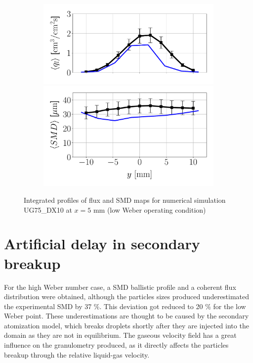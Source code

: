 \begin{figure}[ht]
\begin{subfigure}[b]{0.4\textwidth}
	\flushleft
   \includegraphics[scale=0.35]{./part2_developments/figures_ch6_lagrangian_JICF/params_OP/profiles/flux_along_y}\\
   \vspace{-0.16in}
   \includegraphics[scale=0.35]{./part2_developments/figures_ch6_lagrangian_JICF/params_OP/profiles/SMD_along_y}
\end{subfigure}
\vspace*{-0.2in}
\caption{Integrated profiles of flux and SMD maps for numerical simulation UG75\_DX10 at $x = 5$ mm (low Weber operating condition)}
\label{fig:profiles_LGS_JICF_OP}
\end{figure}


\section{Artificial delay in secondary breakup}
\label{sec:LGS_delay_secon_atom}

For the high Weber number case, a SMD ballistic profile and a coherent flux distribution were obtained, although the particles sizes produced underestimated the experimental SMD by 37 $\%$. This deviation got reduced to 20 $\%$ for the low Weber point. These underestimations are thought to be caused by the secondary atomization model, which breaks droplets shortly after they are injected into the domain as they are not in equilibrium. The gaseous velocity field has a great influence on the granulometry produced, as it directly affects the particles breakup through the relative liquid-gas velocity. 

